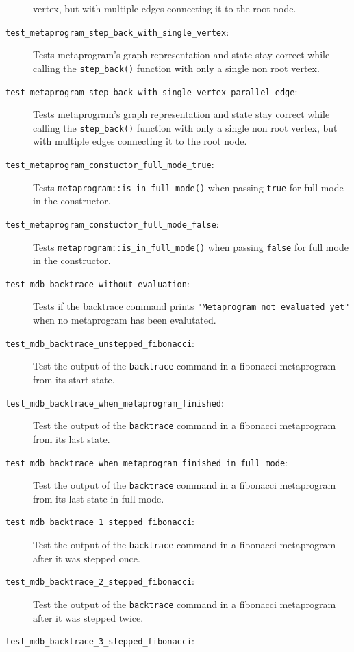 \begin{description}
        vertex, but with multiple edges connecting it to the root node.
    \item[\texttt{test\_metaprogram\_step\_back\_with\_single\_vertex}:]
        Tests metaprogram's graph representation and state stay correct while
        calling the \texttt{step\_back()} function with only a single non root
        vertex.
    \item[\texttt{test\_metaprogram\_step\_back\_with\_single\_vertex\_parallel\_edge}:]
        Tests metaprogram's graph representation and state stay correct while
        calling the \texttt{step\_back()} function with only a single non root
        vertex, but with multiple edges connecting it to the root node.
    \item[\texttt{test\_metaprogram\_constuctor\_full\_mode\_true}:]
        Tests \texttt{metaprogram::is\_in\_full\_mode()} when passing
        \texttt{true} for full mode in the constructor.
    \item[\texttt{test\_metaprogram\_constuctor\_full\_mode\_false}:]
        Tests \texttt{metaprogram::is\_in\_full\_mode()} when passing
        \texttt{false} for full mode in the constructor.
    \item[\texttt{test\_mdb\_backtrace\_without\_evaluation}:]
        Tests if the backtrace command prints
        \texttt{"Metaprogram not evaluated yet"} when no metaprogram has been
        evalutated.
    \item[\texttt{test\_mdb\_backtrace\_unstepped\_fibonacci}:]
        Test the output of the \texttt{backtrace} command in a fibonacci
        metaprogram from its start state.
    \item[\texttt{test\_mdb\_backtrace\_when\_metaprogram\_finished}:]
        Test the output of the \texttt{backtrace} command in a fibonacci
        metaprogram from its last state.
    \item[\texttt{test\_mdb\_backtrace\_when\_metaprogram\_finished\_in\_full\_mode}:]
        Test the output of the \texttt{backtrace} command in a fibonacci
        metaprogram from its last state in full mode.
    \item[\texttt{test\_mdb\_backtrace\_1\_stepped\_fibonacci}:]
        Test the output of the \texttt{backtrace} command in a fibonacci
        metaprogram after it was stepped once.
    \item[\texttt{test\_mdb\_backtrace\_2\_stepped\_fibonacci}:]
        Test the output of the \texttt{backtrace} command in a fibonacci
        metaprogram after it was stepped twice.
    \item[\texttt{test\_mdb\_backtrace\_3\_stepped\_fibonacci}:]

\end{description}
